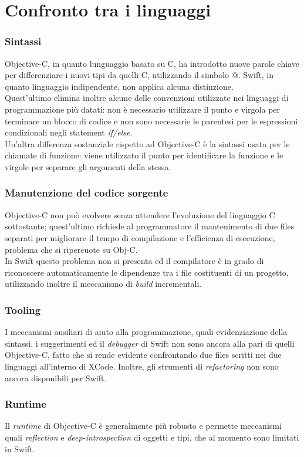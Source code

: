 \chapter{Confronto tra i linguaggi}
\subsection{Sintassi}
Objective-C, in quanto lunguaggio basato su C, ha introdotto nuove parole chiave per differenziare i nuovi tipi da quelli C, utilizzando il simbolo @. Swift, in quanto linguaggio indipendente, non applica alcuna distinzione.\\
Quest'ultimo elimina inoltre alcune delle convenzioni utilizzate nei linguaggi di programmazione più datati: non è necessario utilizzare il punto e virgola per terminare un blocco di codice e non sono necessarie le parentesi per le espressioni condizionali negli statement \textit{if/else}.\\
Un'altra differenza sostanziale rispetto ad Objective-C è la sintassi usata per le chiamate di funzione: viene utilizzato il punto per identificare la funzione e le virgole per separare gli argomenti della stessa.
\subsection{Manutenzione del codice sorgente}
Objective-C non può evolvere senza attendere l'evoluzione del linguaggio C sottostante; quest'ultimo richiede al programmatore il mantenimento di due files separati per migliorare il tempo di compilazione e l'efficienza di esecuzione, problema che si ripercuote su Obj-C.\\
In Swift questo problema non si presenta ed il compilatore è in grado di riconoscere automaticamente le dipendenze tra i file costituenti di un progetto, utilizzando inoltre il meccanismo di \textit{build} incrementali.
\subsection{Tooling}
I meccanismi ausiliari di aiuto alla programmazione, quali evidenziazione della sintassi, i suggerimenti ed il \textit{debugger} di Swift non sono ancora alla pari di quelli Objective-C, fatto che si rende evidente confrontando due files scritti nei due linguaggi all'interno di XCode. Inoltre, gli strumenti di \textit{refactoring} non sono ancora disponibili per Swift.
\subsection{Runtime}
Il \textit{runtime} di Objective-C è generalmente più robusto e permette meccanismi quali \textit{reflection} e \textit{deep-introspection} di oggetti e tipi, che al momento sono limitati in Swift.
